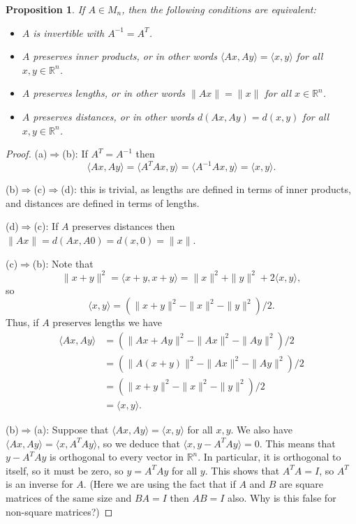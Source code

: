 \documentclass{amsart}
\newcommand{\R}         {{\mathbb{R}}}
\newcommand{\ip}[1]     {\langle #1\rangle}
\renewcommand{\:}{\colon}
\newtheorem{proposition}[theorem]{Proposition}
\theoremstyle{definition}
\begin{document}
\begin{proposition}\label{prop-orthogonal}
 If $A\in M_n$, then the following conditions are equivalent:
 \begin{itemize}
 \item[(a)] $A$ is invertible with $A^{-1}=A^T$.
 \item[(b)] $A$ preserves inner products, or in other words
  $\ip{Ax,Ay}=\ip{x,y}$ for all $x,y\in\R^n$.
 \item[(c)] $A$ preserves lengths, or in other words $\|Ax\|=\|x\|$
  for all $x\in\R^n$.
 \item[(d)] $A$ preserves distances, or in other words
  $d(Ax,Ay)=d(x,y)$ for all $x,y\in\R^n$.
 \end{itemize}
\end{proposition}
\begin{proof}
 (a)$\Rightarrow$(b):
  If $A^T=A^{-1}$ then
  \[ \ip{Ax,Ay}=\ip{A^TAx,y}=\ip{A^{-1}Ax,y}=\ip{x,y}. \]

 (b)$\Rightarrow$(c)$\Rightarrow$(d): this is trivial, as lengths are
  defined in terms of inner products, and distances are defined in
  terms of lengths.

 (d)$\Rightarrow$(c): If $A$ preserves distances then
  $\|Ax\|=d(Ax,A0)=d(x,0)=\|x\|$.

 (c)$\Rightarrow$(b): Note that
  \[ \|x+y\|^2=\ip{x+y,x+y}=\|x\|^2 + \|y\|^2 + 2\ip{x,y}, \]
  so
  \[ \ip{x,y} = (\|x+y\|^2 - \|x\|^2 - \|y\|^2)/2. \]
  Thus, if $A$ preserves lengths we have
  \begin{align*}
   \ip{Ax,Ay} &= (\|Ax+Ay\|^2 - \|Ax\|^2 - \|Ay\|^2)/2 \\
              &= (\|A(x+y)\|^2 - \|Ax\|^2 - \|Ay\|^2)/2 \\
              &= (\|x+y\|^2 - \|x\|^2 - \|y\|^2)/2 \\
              &= \ip{x,y}.
  \end{align*}
  
 (b)$\Rightarrow$(a): Suppose that $\ip{Ax,Ay}=\ip{x,y}$ for all
  $x,y$.  We also have $\ip{Ax,Ay}=\ip{x,A^TAy}$, so we deduce that
  $\ip{x,y-A^TAy}=0$.  This means that $y-A^TAy$ is orthogonal to
  every vector in $\R^n$.  In particular, it is orthogonal to itself,
  so it must be zero, so $y=A^TAy$ for all $y$.  This shows that
  $A^TA=I$, so $A^T$ is an inverse for $A$.  (Here we are using the
  fact that if $A$ and $B$ are square matrices of the same size and
  $BA=I$ then $AB=I$ also.  Why is this false for non-square
  matrices?)
\end{proof}
\end{document}
